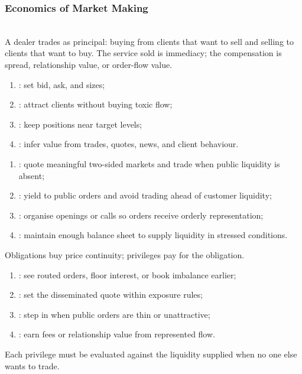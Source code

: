 \subsubsection{Economics of Market Making}

\begin{definition} \\
A dealer trades as principal: buying from clients that want to sell and selling to clients that want to buy. The service sold is immediacy; the compensation is spread, relationship value, or order-flow value.
\end{definition}

\begin{taxonomy} 
\begin{enumerate}[label=\roman*.]
\setlength{\itemsep}{0pt}
\item {}: set bid, ask, and sizes;
\item {}: attract clients without buying toxic flow;
\item {}: keep positions near target levels;
\item {}: infer value from trades, quotes, news, and client behaviour.
\end{enumerate}
\end{taxonomy}

\begin{taxonomy} 
\begin{enumerate}[label=\roman*.]
\setlength{\itemsep}{0pt}
\item {}: quote meaningful two-sided markets and trade when public liquidity is absent;
\item {}: yield to public orders and avoid trading ahead of customer liquidity;
\item {}: organise openings or calls so orders receive orderly representation;
\item {}: maintain enough balance sheet to supply liquidity in stressed conditions.
\end{enumerate}
Obligations buy price continuity; privileges pay for the obligation.
\end{taxonomy}

\begin{taxonomy} 
\begin{enumerate}[label=\roman*.]
\setlength{\itemsep}{0pt}
\item {}: see routed orders, floor interest, or book imbalance earlier;
\item {}: set the disseminated quote within exposure rules;
\item {}: step in when public orders are thin or unattractive;
\item {}: earn fees or relationship value from represented flow.
\end{enumerate}
Each privilege must be evaluated against the liquidity supplied when no one else wants to trade.
\end{taxonomy}

